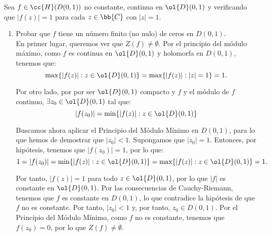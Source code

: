 \documentclass[12pt]{article}
\begin{document}
    \begin{ejercicio}[2.5 puntos]
        Sea $f \in \cc{H}(D(0, 1))$ no constante, continua en $\ol{D}(0, 1)$ y verificando que $|f(z)| = 1$ para cada $z \in \bb{C}$ con $|z| = 1$.
        \begin{enumerate}
            \item Probar que $f$ tiene un número finito (no nulo) de ceros en $D(0, 1)$.\\
            
            En primer lugar, queremos ver que $Z(f)\neq \emptyset$. Por el principio del módulo máximo, como $f$ es continua en $\ol{D}(0, 1)$ y holomorfa en $D(0, 1)$, tenemos que:
            \begin{equation*}
                \max\{|f(z)| : z \in \ol{D}(0, 1)\} = \max\{|f(z)| : |z|=1\} = 1.
            \end{equation*}

            Por otro lado, por por ser $\ol{D}(0, 1)$ compacto y $f$ y el módulo de $f$ continuo, $\exists z_0 \in \ol{D}(0, 1)$ tal que:
            \begin{equation*}
                |f(z_0)| = \min\{|f(z)| : z \in \ol{D}(0, 1)\}
            \end{equation*}

            Buscamos ahora aplicar el Principio del Módulo Mínimo en $D(0, 1)$, para lo que hemos de demostrar que $|z_0| < 1$. Supongamos que $|z_0| = 1$. Entonces, por hipótesis, tenemos que $|f(z_0)| = 1$, por lo que:
            \begin{equation*}
                1 = |f(z_0)| = \min\{|f(z)| : z \in \ol{D}(0, 1)\} = \max\{|f(z)| : z \in \ol{D}(0, 1)\} = 1.
            \end{equation*}

            Por tanto, $|f(z)| = 1$ para todo $z \in \ol{D}(0, 1)$, por lo que $|f|$ es constante en $\ol{D}(0, 1)$. Por las consecuencias de Cauchy-Riemann, tenemos que $f$ es constante en $D(0, 1)$, lo que contradice la hipótesis de que $f$ no es constante. Por tanto, $|z_0| < 1$ y, por tanto, $z_0 \in D(0, 1)$. Por el Principio del Módulo Mínimo, como $f$ no es constante, tenemos que $f(z_0) = 0$, por lo que $Z(f) \neq \emptyset$.\\


\end{enumerate}
\end{ejercicio}
\end{document}
